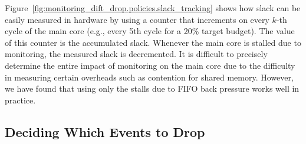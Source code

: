 Figure~\ref{fig:monitoring_dift_drop.policies.slack_tracking} shows how slack
can be easily measured in hardware by using a counter that increments on
every $k$-th cycle of the main core (e.g., every 5th cycle for a 20\% target
budget). The value of this counter is the accumulated slack. Whenever the main
core is stalled due to monitoring, the measured slack is decremented. It is
difficult to precisely determine the entire impact of monitoring on the main
core due to the difficulty in measuring certain overheads such as contention
for shared memory. However, we have found that using only the stalls due to
FIFO back pressure works well in practice.

\subsection{Deciding Which Events to Drop} 
\label{sec:monitoring_dift_drop.policies.which}

